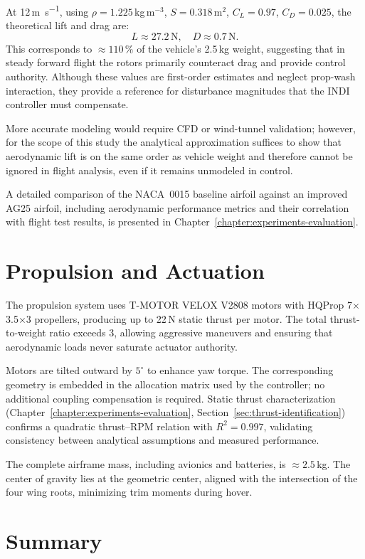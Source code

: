 At 12\,\si{\meter\per\second}, using $\rho = 1.225$\,kg\,m$^{-3}$, $S = 0.318$\,m$^{2}$, $C_L = 0.97$, $C_D = 0.025$, the theoretical lift and drag are:
\[
L \approx 27.2\,\text{N}, \quad D \approx 0.7\,\text{N}.
\]
This corresponds to $\approx 110\,\%$ of the vehicle's 2.5\,kg weight, suggesting that in steady forward flight the rotors primarily counteract drag and provide control authority. Although these values are first-order estimates and neglect prop-wash interaction, they provide a reference for disturbance magnitudes that the INDI controller must compensate.

More accurate modeling would require CFD or wind-tunnel validation; however, for the scope of this study the analytical approximation suffices to show that aerodynamic lift is on the same order as vehicle weight and therefore cannot be ignored in flight analysis, even if it remains unmodeled in control.

A detailed comparison of the NACA~0015 baseline airfoil against an improved AG25 airfoil, including aerodynamic performance metrics and their correlation with flight test results, is presented in Chapter~\ref{chapter:experiments-evaluation}.

\section{Propulsion and Actuation}

The propulsion system uses T-MOTOR VELOX V2808 motors with HQProp 7$\times$3.5$\times$3 propellers, producing up to 22\,N static thrust per motor. The total thrust-to-weight ratio exceeds 3, allowing aggressive maneuvers and ensuring that aerodynamic loads never saturate actuator authority.

Motors are tilted outward by $5^{\circ}$ to enhance yaw torque. The corresponding geometry is embedded in the allocation matrix used by the controller; no additional coupling compensation is required. Static thrust characterization (Chapter~\ref{chapter:experiments-evaluation}, Section~\ref{sec:thrust-identification}) confirms a quadratic thrust--RPM relation with $R^2 = 0.997$, validating consistency between analytical assumptions and measured performance.

The complete airframe mass, including avionics and batteries, is $\approx 2.5$\,kg. The center of gravity lies at the geometric center, aligned with the intersection of the four wing roots, minimizing trim moments during hover.

\section{Summary}

